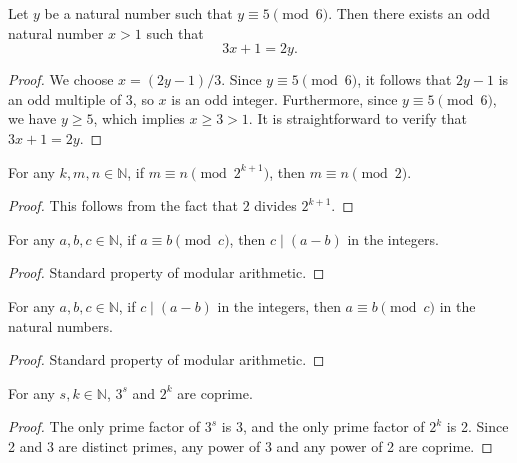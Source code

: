 \begin{lemma}\label{lemma:exists_predecessor_gt_one_mod5}\leanok
Let $y$ be a natural number such that $y \equiv 5 \pmod 6$. Then there exists an odd natural
number $x > 1$ such that
\begin{equation}
    3x + 1 = 2y.
\end{equation}
\end{lemma}
\begin{proof}\leanok
We choose $x = (2y - 1)/3$. Since $y \equiv 5 \pmod 6$, it follows that $2y - 1$ is an odd multiple
of $3$, so $x$ is an odd integer.
Furthermore, since $y \equiv 5 \pmod 6$, we have $y \ge 5$, which implies $x \ge 3 > 1$.
It is straightforward to verify that $3x + 1 = 2y$.
\end{proof}

\begin{lemma}\label{lemma:parity_of_mod_pow_succ}\leanok
For any $k, m, n \in \mathbb{N}$, if $m \equiv n \pmod{2^{k+1}}$, then $m \equiv n \pmod 2$.
\end{lemma}
\begin{proof}\leanok
This follows from the fact that $2$ divides $2^{k+1}$.
\end{proof}

\begin{lemma}\label{lemma:int_dvd_sub_of_mod_eq}\leanok
For any $a, b, c \in \mathbb{N}$, if $a \equiv b \pmod c$, then $c \mid (a - b)$ in the integers.
\end{lemma}
\begin{proof}\leanok
Standard property of modular arithmetic.
\end{proof}

\begin{lemma}\label{lemma:nat_mod_eq_of_int_dvd_sub}\leanok
For any $a, b, c \in \mathbb{N}$, if $c \mid (a - b)$ in the integers, then $a \equiv b \pmod c$ in the natural numbers.
\end{lemma}
\begin{proof}\leanok
Standard property of modular arithmetic.
\end{proof}

\begin{lemma}\label{lemma:coprime_pow_three_pow_two}\leanok
For any $s, k \in \mathbb{N}$, $3^s$ and $2^k$ are coprime.
\end{lemma}
\begin{proof}\leanok
The only prime factor of $3^s$ is 3, and the only prime factor of $2^k$ is 2. Since 2 and 3 are distinct primes, any power of 3 and any power of 2 are coprime.
\end{proof}

